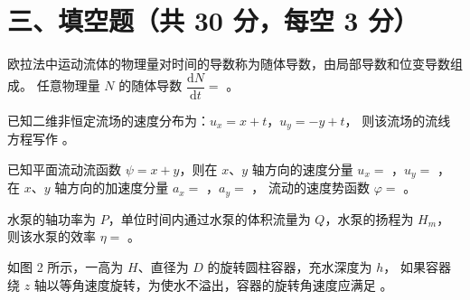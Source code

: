 \section{三、填空题（共 30 分，每空 3 分）}

\begin{ti}
  \item 欧拉法中运动流体的物理量对时间的导数称为随体导数，由局部导数和位变导数组成。
  任意物理量 $N$ 的随体导数 $\dfrac{\mathrm{d}N}{\mathrm{d}t}=$ \underline{\hspace{3cm}}。
  \hfill{}

  \item 已知二维非恒定流场的速度分布为：$u_x=x+t$，$u_y=-y+t$，
  则该流场的流线方程写作 \underline{\hspace{3cm}}。\hfill{}

  \item 已知平面流动流函数 $\psi=x+y$，则在 $x$、$y$ 轴方向的速度分量
  $u_x=$ \underline{\hspace{2cm}}，$u_y=$ \underline{\hspace{2cm}}，
  在 $x$、$y$ 轴方向的加速度分量 $a_x=$ \underline{\hspace{2cm}}，$a_y=$ \underline{\hspace{2cm}}，
  流动的速度势函数 $\varphi=$ \underline{\hspace{2cm}}。\hfill{}

  \item 水泵的轴功率为 $P$，单位时间内通过水泵的体积流量为 $Q$，水泵的扬程为 $H_m$，
  则该水泵的效率 $\eta=$ \underline{\hspace{3cm}}。\hfill{}

  \item 如图 2 所示，一高为 $H$、直径为 $D$ 的旋转圆柱容器，充水深度为 $h$，
  如果容器绕 $z$ 轴以等角速度旋转，为使水不溢出，容器的旋转角速度应满足
  \underline{\hspace{3cm}}。\hfill{}


\end{ti}
